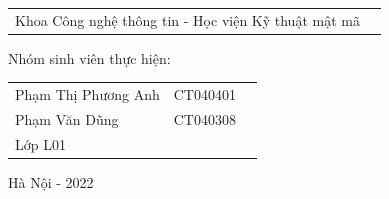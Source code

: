 \begin{titlepage}
\begin{flushleft}
\begin{tabular}{l c}
        \hspace{4cm}Khoa Công nghệ thông tin - Học viện Kỹ thuật mật mã

        \end{tabular}
        
        \vspace{0.6cm}

        \hspace{3cm}Nhóm sinh viên thực hiện:

        \begin{tabular}{l c c}
        
        \hspace{4cm}Phạm Thị Phương Anh & CT040401 \\

        \hspace{4cm}Phạm  Văn Dũng & CT040308 \\

        \hspace{4cm}Lớp L01


        \end{tabular}

    \end{flushleft}
    
    \begin{center}
            
       \vspace{1cm}
            
      Hà Nội - 2022
            
   \end{center}
\end{titlepage}